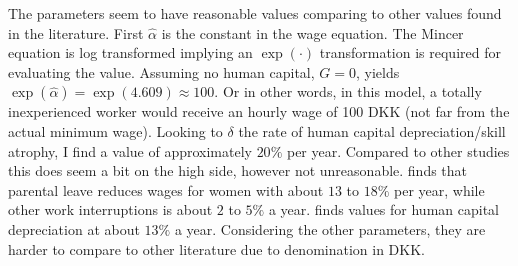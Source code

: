 The parameters seem to have reasonable values comparing to other values found in the literature. First $\hat{\alpha} $ is the constant in the wage equation.
The Mincer equation is log transformed implying an $\exp (\cdot)$ transformation is required for evaluating the value. 
Assuming no human capital, $G=0$, yields $\exp (\hat{\alpha}) = \exp ( 4.609 ) \approx 100$. 
Or in other words, in this model, a totally inexperienced worker would receive an hourly wage of 100 DKK (not far from the actual minimum wage). 
Looking to $\delta$ the rate of human capital depreciation/skill atrophy, I find a value of approximately $20 \%$ per year. Compared to other studies this does seem a bit on the high side, however not unreasonable. \textcite{kunze_timing_2002} finds that parental leave reduces wages for women with about $13$ to $18 \%$ per year, while other work interruptions is about $2$  to $5 \%$ a year. \textcite{light_early-career_1995} finds values for human capital depreciation at about $13 \%$ a year. Considering the other parameters, they are harder to compare to other literature due to denomination in DKK. 


